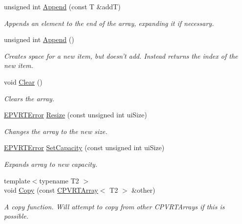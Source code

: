 \begin{DoxyCompactItemize}
unsigned int \hyperlink{class_c_p_v_r_t_array_a1af5aeb05badf2783dbc7ec5b98cead2}{Append} (const T \&add\+T)
\begin{DoxyCompactList}\small\item\em Appends an element to the end of the array, expanding it if necessary. \end{DoxyCompactList}\item 
unsigned int \hyperlink{class_c_p_v_r_t_array_ab2bc8bc53cb034a72bb9a017204ece35}{Append} ()
\begin{DoxyCompactList}\small\item\em Creates space for a new item, but doesn't add. Instead returns the index of the new item. \end{DoxyCompactList}\item 
void \hyperlink{class_c_p_v_r_t_array_ad1e3c37b05d484c9e5598899d6611440}{Clear} ()
\begin{DoxyCompactList}\small\item\em Clears the array. \end{DoxyCompactList}\item 
\hyperlink{_p_v_r_t_error_8h_a9e837ff1a83f3a5f332bc4cc78454608}{E\+P\+V\+R\+T\+Error} \hyperlink{class_c_p_v_r_t_array_a00a9fef0228cc45482ece29697b3c709}{Resize} (const unsigned int ui\+Size)
\begin{DoxyCompactList}\small\item\em Changes the array to the new size. \end{DoxyCompactList}\item 
\hyperlink{_p_v_r_t_error_8h_a9e837ff1a83f3a5f332bc4cc78454608}{E\+P\+V\+R\+T\+Error} \hyperlink{class_c_p_v_r_t_array_a097da9314fcbfec1239b357935732ea4}{Set\+Capacity} (const unsigned int ui\+Size)
\begin{DoxyCompactList}\small\item\em Expands array to new capacity. \end{DoxyCompactList}\item 
{\footnotesize template$<$typename T2 $>$ }\\void \hyperlink{class_c_p_v_r_t_array_a70ca000efcc4a44bb71badcd9b3c7714}{Copy} (const \hyperlink{class_c_p_v_r_t_array}{C\+P\+V\+R\+T\+Array}$<$ T2 $>$ \&other)
\begin{DoxyCompactList}\small\item\em A copy function. Will attempt to copy from other C\+P\+V\+R\+T\+Arrays if this is possible. \end{DoxyCompactList}\item 

\end{DoxyCompactItemize}
